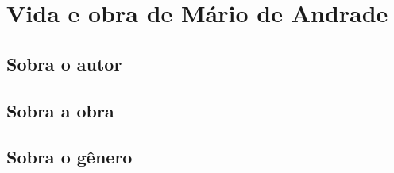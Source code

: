 \chapter{Vida e obra de Mário de Andrade}

\section{Sobra o autor}

\section{Sobra a obra}


\section{Sobra o gênero}